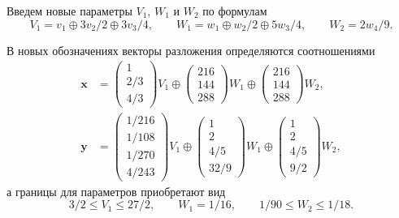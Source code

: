 \documentclass[specialist,
               substylefile = spbu.rtx,
               subf,href,colorlinks=true, 12pt]{disser}
\theoremstyle{definition}
\begin{document}
Введем новые параметры $V_{1}$, $W_{1}$ и $W_{2}$ по формулам
\begin{equation*}
V_{1}
=
v_{1}\oplus3v_{2}/2\oplus3v_{3}/4,
\qquad
W_{1}
=
w_{1}\oplus w_{2}/2\oplus5w_{3}/4,
\qquad
W_{2}
=
2w_{4}/9.
\end{equation*}

В новых обозначениях векторы разложения определяются соотношениями
\begin{align*}
\bm{x}
&=
\begin{pmatrix}
 1
\\
 2/3
\\
 4/3
\end{pmatrix} 
V_{1}
\oplus
\begin{pmatrix}
 216
\\
 144
\\
 288
\end{pmatrix}
 W_{1}
\oplus
\begin{pmatrix}
 216
\\
 144
\\
 288
\end{pmatrix}
 W_{2},
\\
\bm{y}
&=
\begin{pmatrix}
 1/216
\\
 1/108
\\
 1/270
\\
 4/243
\end{pmatrix} 
V_{1}
\oplus
\begin{pmatrix}
 1
\\
 2
\\
 4/5
\\
 32/9
\end{pmatrix}
W_{1}
\oplus
\begin{pmatrix}
 1
\\
 2
\\
 4/5
\\
 9/2
\end{pmatrix}
W_{2},
\end{align*}
а границы для параметров приобретают вид
\begin{equation*}
3/2
\leq
V_{1}
\leq
27/2,
\qquad
W_{1}
=
1/16,
\qquad
1/90
\leq
W_{2}
\leq
1/18.
\end{equation*}
\end{document}
